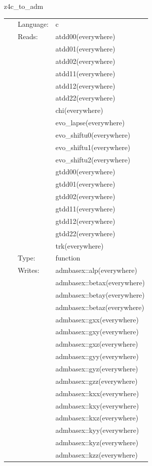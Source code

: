 \documentclass{article}
\begin{document}
\hspace{5mm} z4c\_to\_adm 

\hspace{5mm}{\it function `z4c\_to\_adm` generated by einsteinengine. } 


\hspace{5mm}

 \begin{tabular*}{160mm}{cll} 
~ & Language:  & c \\ 
~ & Reads:  & atdd00(everywhere) \\ 
~& ~ &atdd01(everywhere)\\ 
~& ~ &atdd02(everywhere)\\ 
~& ~ &atdd11(everywhere)\\ 
~& ~ &atdd12(everywhere)\\ 
~& ~ &atdd22(everywhere)\\ 
~& ~ &chi(everywhere)\\ 
~& ~ &evo\_lapse(everywhere)\\ 
~& ~ &evo\_shiftu0(everywhere)\\ 
~& ~ &evo\_shiftu1(everywhere)\\ 
~& ~ &evo\_shiftu2(everywhere)\\ 
~& ~ &gtdd00(everywhere)\\ 
~& ~ &gtdd01(everywhere)\\ 
~& ~ &gtdd02(everywhere)\\ 
~& ~ &gtdd11(everywhere)\\ 
~& ~ &gtdd12(everywhere)\\ 
~& ~ &gtdd22(everywhere)\\ 
~& ~ &trk(everywhere)\\ 
~ & Type:  & function \\ 
~ & Writes:  & admbasex::alp(everywhere) \\ 
~& ~ &admbasex::betax(everywhere)\\ 
~& ~ &admbasex::betay(everywhere)\\ 
~& ~ &admbasex::betaz(everywhere)\\ 
~& ~ &admbasex::gxx(everywhere)\\ 
~& ~ &admbasex::gxy(everywhere)\\ 
~& ~ &admbasex::gxz(everywhere)\\ 
~& ~ &admbasex::gyy(everywhere)\\ 
~& ~ &admbasex::gyz(everywhere)\\ 
~& ~ &admbasex::gzz(everywhere)\\ 
~& ~ &admbasex::kxx(everywhere)\\ 
~& ~ &admbasex::kxy(everywhere)\\ 
~& ~ &admbasex::kxz(everywhere)\\ 
~& ~ &admbasex::kyy(everywhere)\\ 
~& ~ &admbasex::kyz(everywhere)\\ 
~& ~ &admbasex::kzz(everywhere)\\ 
\end{tabular*} 
\end{document}
